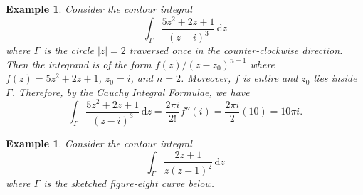 \documentclass[10pt]{article}
\newcommand{\dd}{\,\mathrm{d}}
\theoremstyle{newstyle}
\newtheorem{exmp}[thm]{Example}
\begin{document}
\begin{exmp}
Consider the contour integral 
\[ \int_\Gamma \frac{5z^2+2z+1}{(z-i)^3}\dd z \]
where $\Gamma$ is the circle $|z| = 2$ traversed once in the counter-clockwise direction. 
Then the integrand is of the form $f(z)/(z-z_0)^{n+1}$ where $f(z) = 5z^2+2z+1$, 
$z_0 = i$, and $n = 2$. Moreover, $f$ is entire and $z_0$ lies inside $\Gamma$. 
Therefore, by the Cauchy Integral Formulae, we have 
\[ \int_\Gamma \frac{5z^2+2z+1}{(z-i)^3}\dd z = \frac{2\pi i}{2!} f''(i) = \frac{2\pi i}2(10) = 10\pi i. \]
\end{exmp}

\begin{exmp}
Consider the contour integral 
\[ \int_\Gamma \frac{2z+1}{z(z-1)^2}\dd z \]
where $\Gamma$ is the sketched figure-eight curve below. 

\begin{center}


\begin{tikzpicture}[x=0.75pt,y=0.75pt,yscale=-1,xscale=1]


\end{tikzpicture}
\end{center}
\end{exmp}
\end{document}
